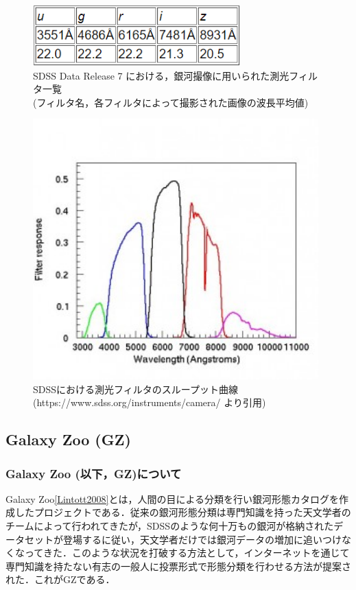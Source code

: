 \documentclass[a4j, 11pt]{jarticle}
\begin{document}
\begin{figure}[H]
	\centering
	\includegraphics[width=8cm]{images/dr7_filters.png}
	\caption{SDSS Data Release 7 における，銀河撮像に用いられた測光フィルタ一覧\\(フィルタ名，各フィルタによって撮影された画像の波長平均値)}
	\label{fig:dr7_filters}
\end{figure}

\begin{figure}[H]
 \centering
 \includegraphics[width=11cm]{images/camera_filters-300x274}
 \caption{SDSSにおける測光フィルタのスループット曲線\\(https://www.sdss.org/instruments/camera/ より引用)}
 \label{fig:filter_responces}
\end{figure}



\subsection{Galaxy Zoo (GZ)}
\subsubsection*{Galaxy Zoo (以下，GZ)について}
Galaxy Zoo\ref{Lintott2008}とは，人間の目による分類を行い銀河形態カタログを作成したプロジェクトである．従来の銀河形態分類は専門知識を持った天文学者のチームによって行われてきたが，SDSSのような何十万もの銀河が格納されたデータセットが登場するに従い，天文学者だけでは銀河データの増加に追いつけなくなってきた．このような状況を打破する方法として，インターネットを通じて専門知識を持たない有志の一般人に投票形式で形態分類を行わせる方法が提案された．これがGZである．
\end{document}
